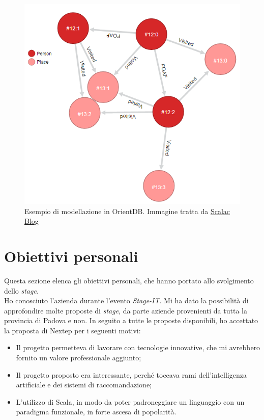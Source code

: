 \begin{figure}[ht]
\centering
\includegraphics[scale=0.60]{immagini/graph_orientdb}
\caption{Esempio di modellazione in OrientDB. Immagine tratta da \href{http://blog.scalac.io/2015/11/26/orientdb-and-scala-part1.html}{Scalac Blog}}
\label{fig:orientdb-graph}
\end{figure}




\section{Obiettivi personali}
Questa sezione elenca gli obiettivi personali, che hanno portato allo svolgimento dello \emph{stage}.\\Ho conosciuto l'azienda durante l'evento \emph{Stage-IT}. Mi ha dato la possibilità di approfondire molte proposte di \emph{stage}, da parte aziende provenienti da tutta la provincia di Padova e non. In seguito a tutte le proposte disponibili, ho accettato la proposta di Nextep per i seguenti motivi:
\begin{itemize}
\item Il progetto permetteva di lavorare con tecnologie innovative, che mi avrebbero fornito un valore professionale aggiunto;
\item Il progetto proposto era interessante, perché toccava rami dell'intelligenza artificiale e dei sistemi di raccomandazione;
\item L'utilizzo di Scala, in modo da poter padroneggiare un linguaggio con un paradigma funzionale, in forte ascesa di popolarità.
\end{itemize}
